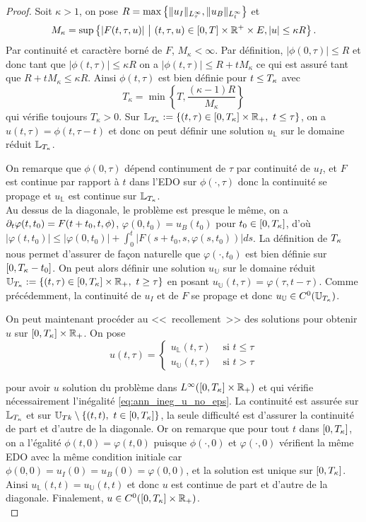 \begin{proof}
Soit $\kappa > 1$, on pose $R = \max\left\{\|u_I\|_{L^{\infty}_{\tau}},\|u_B\|_{L^{\infty}_t}\right\}$ et 
$$ M_{\kappa} = \sup \left\{ |F(t,\tau,u)| \ \big |\ (t,\tau,u)\in [0,T]\times\R^+\times E, |u|\leq \kappa R \right\}. $$
Par continuité et caractère borné de $F$, $M_{\kappa} < \infty$. Par définition, $|\phi(0,\tau)| \leq R$ et donc tant que $|\phi(t,\tau)| \leq \kappa R$ on a 
$ |\phi(t,\tau)| \leq R + t M_{\kappa} $
ce qui est assuré tant que $R + t M_{\kappa} \leq \kappa R$. 
Ainsi $\phi(t,\tau)$ est bien définie pour $t\leq T_{\kappa}$ avec 
\begin{equation} 
T_{\kappa} = \min \left\{ T, \frac{(\kappa - 1)R}{M_{\kappa}} \right\}
\label{eq:ann_def_Tk}
\end{equation}
qui vérifie toujours $T_{\kappa} > 0$. 
Sur $\mathbb{L}_{T_{\kappa}} := \{(t,\tau)\in [0,T_{\kappa}]\times\mathbb{R}_+,\ t\leq\tau\}$, on a $u(t,\tau) = \phi(t,\tau-t)$ et donc on peut définir une solution $u_{\mathbb{L}}$ sur le domaine réduit $\mathbb{L}_{T_{\kappa}}$. 

On remarque que $\phi(0,\tau)$ dépend continument de $\tau$ par continuité de $u_I$, et $F$ est continue par rapport à $t$ dans l'EDO sur $\phi(\cdot,\tau)$ donc la continuité se propage et $u_{\mathbb L}$ est continue sur $\mathbb{L}_{T_{\kappa}}$. 
\\

Au dessus de la diagonale, le problème est presque le même, on a $\partial_t\varphi(t,t_0) = F(t + t_0, t, \phi)$, $\varphi(0,t_0) = u_B(t_0)$ pour $t_0\in[0,T_{\kappa}]$, d'où $|\varphi(t,t_0)| \leq |\varphi(0,t_0)|  + \int_0^t |F(s+t_0,s,\varphi(s,t_0))|ds$. 
La définition de $T_{\kappa}$ nous permet d'assurer de façon naturelle que $\varphi(\cdot,t_0)$ est bien définie sur $[0,T_{\kappa}-t_0]$. 
On peut alors définir une solution $u_{\mathbb{U}}$ sur le domaine réduit $\mathbb{U}_{T_{\kappa}} := \{(t,\tau)\in [0,T_{\kappa}]\times\mathbb{R}_+,\ t\geq\tau\}$ en posant $u_{\mathbb U}(t,\tau) = \varphi(\tau,t-\tau)$. 
Comme précédemment, la continuité de $u_I$ et de $F$ se propage et donc $u_{\mathbb{U}}\in C^0(\mathbb{U}_{T_{\kappa}})$. 

On peut maintenant procéder au <<~recollement~>> des solutions pour obtenir $u$ sur $[0,T_{\kappa}]\times\mathbb{R}_+$. On pose 
$$ u(t,\tau) = \begin{cases}
u_{\mathbb{L}}(t,\tau) & \text{ si } t\leq\tau \\
u_{\mathbb{U}}(t,\tau) & \text{ si } t > \tau 
\end{cases} $$

pour avoir $u$ solution du problème dans $L^{\infty}([0,T_{\kappa}]\times\mathbb{R}_+)$ et qui vérifie nécessairement l'inégalité \eqref{eq:ann_ineg_u_no_eps}. 
La continuité est assurée sur $\mathbb{L}_{T_{\kappa}}$ et sur $\mathbb{U}_{Tk}\setminus \{(t,t),\ t\in [0,T_{\kappa}]\}$, la seule difficulté est d'assurer la continuité de part et d'autre de la diagonale. 
Or on remarque que pour tout $t$ dans $[0,T_{\kappa}]$, on a l'égalité $\phi(t,0) = \varphi(t,0)$ puisque $\phi(\cdot,0)$ et $\varphi(\cdot,0)$ vérifient la même EDO avec la même condition initiale car $\phi(0,0) = u_I(0) = u_B(0) = \varphi(0,0)$, et la solution est unique sur $[0,T_{\kappa}]$. 
Ainsi $u_{\mathbb{L}}(t,t) = u_{\mathbb{U}}(t,t)$ et donc $u$ est continue de part et d'autre de la diagonale. 
Finalement, $u \in C^0([0,T_{\kappa}]\times\mathbb{R}_+)$. 
\\


\end{proof}
